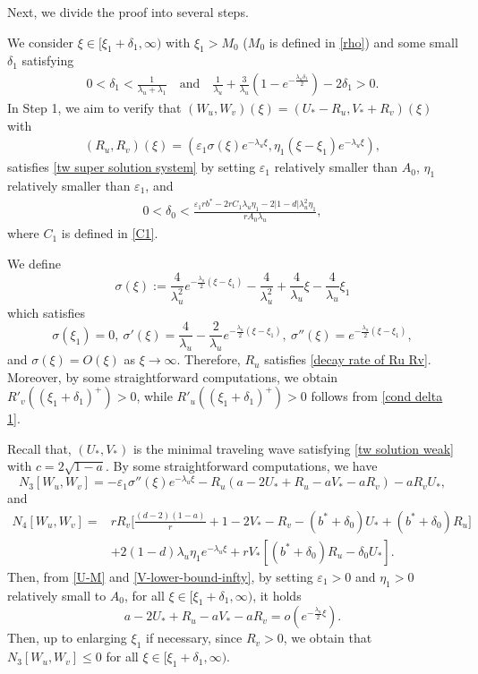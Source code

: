 \documentclass[11pt,a4paper]{article}
\numberwithin{equation}{section}
\numberwithin{figure}{section}
\newcommand\bea{\begin{eqnarray}}
\newcommand\eea{\end{eqnarray}}
\newcommand\beaa{\begin{eqnarray*}}
\newcommand\eeaa{\end{eqnarray*}}
\begin{document}


Next, we  divide the proof into several steps.
\medskip

 We consider $\xi\in[\xi_{1}+\delta_1,\infty)$ with $\xi_1>M_0$ ($M_0$ is defined in \eqref{rho}) and  some small $\delta_1$ satisfying
\bea\label{cond delta 1}
0<\delta_1<\frac{1}{\lambda_u+\lambda_1}\quad\text{and}\quad\frac{1}{\lambda_u}+\frac{3}{\lambda_u}(1-e^{-\frac{\lambda_u\delta_1}{2}})-2\delta_1>0.
\eea
In Step 1, we aim to verify that $(W_u,W_v)(\xi)=(U_*-R_u,V_*+R_v)(\xi)$ with
\beaa
(R_u,R_v)(\xi)=(\varepsilon_1\sigma(\xi)e^{-\lambda_u\xi},\eta_1(\xi-\xi_{1}) e^{-\lambda_u\xi}),
\eeaa
satisfies \eqref{tw super solution system} by setting $\varepsilon_1$ relatively smaller than $A_0$, $\eta_1$ relatively smaller than $\varepsilon_1$, and
\bea\label{cond delta 0 system case 1}
0<\delta_0<\frac{\varepsilon_1rb^*-2rC_1\lambda_u\eta_1-2|1-d|\lambda^2_u\eta_1}{rA_0\lambda_u},
\eea
where $C_1$ is defined in \eqref{C1}.

We define
$$\sigma(\xi):=\frac{4}{\lambda_u^2}e^{-\frac{\lambda_u}{2}(\xi-\xi_1)}-\frac{4}{\lambda_u^2}+\frac{4}{\lambda_u}\xi-\frac{4}{\lambda_u}\xi_1$$
which satisfies 
$$\sigma(\xi_1)=0,\ \sigma'(\xi)=\frac{4}{\lambda_u}-\frac{2}{\lambda_u}e^{-\frac{\lambda_u}{2}(\xi-\xi_1)},\ \sigma''(\xi)=e^{-\frac{\lambda_u}{2}(\xi-\xi_1)},$$ 
and $\sigma(\xi)= O(\xi)$ as $\xi\to\infty$.
Therefore, $R_u$ satisfies \eqref{decay rate of Ru Rv}.
Moreover, by some  straightforward computations, we obtain $R'_v((\xi_1+\delta_1)^+)>0$, while
$R'_u((\xi_1+\delta_1)^+)>0$ follows from \eqref{cond delta 1}.

Recall that, $(U_*,V_*)$ is the minimal traveling wave satisfying \eqref{tw solution weak} with $c=2\sqrt{1-a}$.
By some  straightforward computations,  we have
$$N_3[W_u,W_v]=-\varepsilon_1\sigma''(\xi)e^{-\lambda_u\xi}-R_u(a-2U_*+R_u-aV_*-aR_v)-aR_vU_*,$$
and
\begin{equation*}
\begin{aligned}
N_4[W_u,W_v] = & rR_v\Big[\frac{(d-2)(1-a)}{r}+1-2V_*-R_v-(b^*+\delta_0)U_*+(b^*+\delta_0)R_u\Big]\\
&+2(1-d)\lambda_u\eta_1e^{-\lambda_u\xi}+rV_*[(b^*+\delta_0)R_u-\delta_0U_*].
\end{aligned}
\end{equation*}
 Then, from \eqref{U-M} and \eqref{V-lower-bound-infty}, by setting  $\varepsilon_1>0$ and $\eta_1>0$ relatively small to $A_0$,
for all $\xi\in[\xi_1+\delta_1,\infty)$, it holds
$$a-2U_*+R_u-aV_*-aR_v = o(e^{-\frac{\lambda_u}{2}\xi}).$$
Then, up to enlarging $\xi_1$ if necessary, since $R_v>0$, we obtain that $N_3[W_u,W_v]\leq0$
for all $\xi\in[\xi_1+\delta_1,\infty)$.
\end{document}

